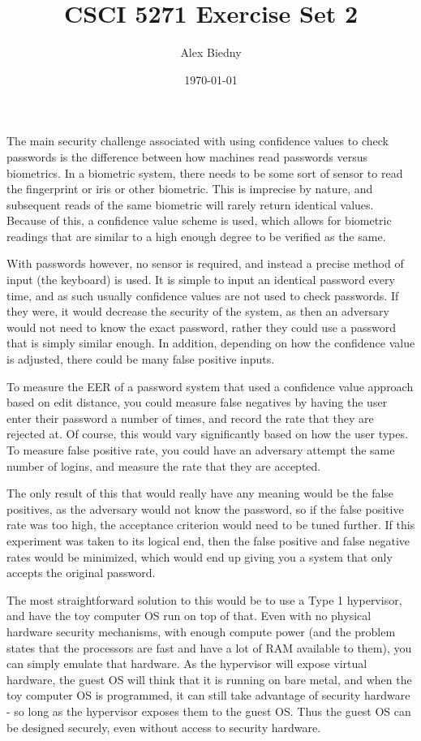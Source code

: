 \documentclass{jhwhw}
\title{CSCI 5271 Exercise Set 2}
\author{Alex Biedny}
\date{\today}
\begin{document}
\maketitle

The main security challenge associated with using confidence values to check passwords is the difference between how machines read passwords versus biometrics. In a biometric system, there needs to be some sort of sensor to read the fingerprint or iris or other biometric. This is imprecise by nature, and subsequent reads of the same biometric will rarely return identical values. Because of this, a confidence value scheme is used, which allows for biometric readings that are similar to a high enough degree to be verified as the same.

With passwords however, no sensor is required, and instead a precise method of input (the keyboard) is used. It is simple to input an identical password every time, and as such usually confidence values are not used to check passwords. If they were, it would decrease the security of the system, as then an adversary would not need to know the exact password, rather they could use a password that is simply similar enough. In addition, depending on how the confidence value is adjusted, there could be many false positive inputs.

To measure the EER of a password system that used a confidence value approach based on edit distance, you could measure false negatives by having the user enter their password a number of times, and record the rate that they are rejected at. Of course, this would vary significantly based on how the user types. To measure false positive rate, you could have an adversary attempt the same number of logins, and measure the rate that they are accepted. 

The only result of this that would really have any meaning would be the false positives, as the adversary would not know the password, so if the false positive rate was too high, the acceptance criterion would need to be tuned further. If this experiment was taken to its logical end, then the false positive and false negative rates would be minimized, which would end up giving you a system that only accepts the original password.

The most straightforward solution to this would be to use a Type 1 hypervisor, and have the toy computer OS run on top of that. Even with no physical hardware security mechanisms, with enough compute power (and the problem states that the processors are fast and have a lot of RAM available to them), you can simply emulate that hardware. As the hypervisor will expose virtual hardware, the guest OS will think that it is running on bare metal, and when the toy computer OS is programmed, it can still take advantage of security hardware - so long as the hypervisor exposes them to the guest OS. Thus the guest OS can be designed securely, even without access to security hardware.
\end{document}
